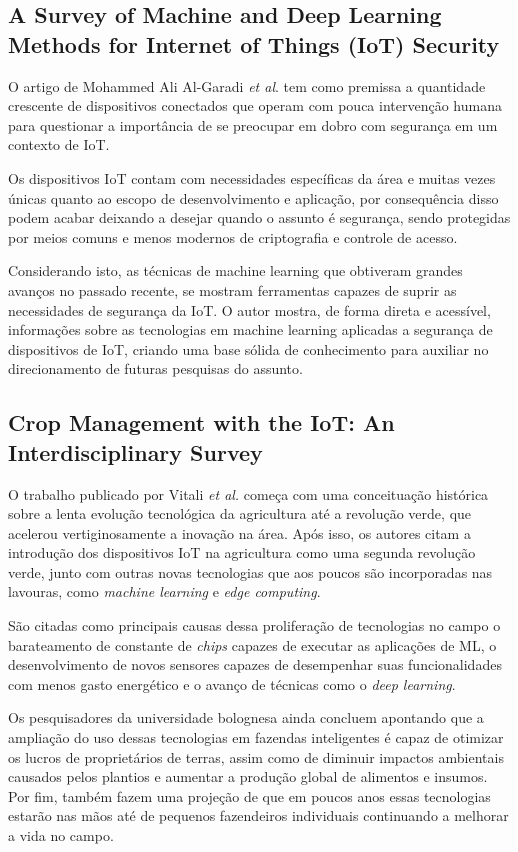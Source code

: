 \documentclass[12pt]{article}
\begin{document}
\subsection{A Survey of Machine and Deep Learning Methods for Internet of Things (IoT) Security \cite{ali}}

O artigo de Mohammed Ali Al-Garadi \emph{et al}. tem como premissa a
quantidade crescente de dispositivos conectados que operam com
pouca intervenção humana para questionar a importância de se preocupar em dobro com segurança
em um contexto de IoT.

Os dispositivos IoT contam com necessidades específicas da área e muitas
vezes únicas quanto ao escopo de desenvolvimento e aplicação, por consequência disso podem acabar
deixando a desejar quando o assunto é segurança, sendo protegidas por meios comuns e menos modernos de criptografia e controle de acesso. 

Considerando isto, as técnicas de machine learning que obtiveram grandes avanços no passado recente, se
mostram ferramentas capazes de suprir as necessidades de segurança da IoT. O autor mostra, de forma direta e acessível, informações sobre as
tecnologias em machine learning aplicadas a segurança de dispositivos de IoT, criando uma base sólida de conhecimento para
auxiliar no direcionamento de futuras pesquisas do assunto.

\subsection{Crop Management with the IoT: An Interdisciplinary Survey \cite{vitali}}

O trabalho publicado por Vitali \emph{et al.} começa com uma conceituação histórica sobre a lenta evolução tecnológica da agricultura até a revolução verde, 
que acelerou vertiginosamente a inovação na área. Após isso, os autores citam a introdução dos dispositivos IoT na agricultura como uma segunda revolução verde,
junto com outras novas tecnologias que aos poucos são incorporadas nas lavouras, como \emph{machine learning} e \emph{edge computing}.

São citadas como principais causas dessa proliferação de tecnologias no campo o barateamento de constante de \emph{chips} capazes de executar as aplicações de ML,
o desenvolvimento de novos sensores capazes de desempenhar suas funcionalidades com menos gasto energético e o avanço de técnicas como o \emph{deep learning}.

Os pesquisadores da universidade bolognesa ainda concluem apontando que a ampliação do uso dessas tecnologias em fazendas inteligentes é capaz de otimizar os lucros
de proprietários de terras, assim como de diminuir impactos ambientais causados pelos plantios e aumentar a produção global de alimentos e insumos. Por fim, também fazem
uma projeção de que em poucos anos essas tecnologias estarão nas mãos até de pequenos fazendeiros individuais continuando a melhorar a vida no campo.
\end{document}

